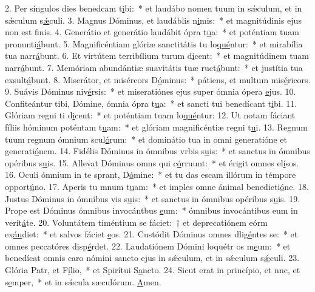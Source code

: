 2. Per síngulos dies benedcam t\uline{i}bi:~* et laudábo nomen tuum in sǽculum, et in sǽculum s\uline{ǽ}culi.
3. Magnus Dóminus, et laudáblis n\uline{i}mis:~* et magnitúdinis ejus non est f\uline{i}nis.
4. Generátio et generátio laudábit ópra t\uline{u}a:~* et poténtiam tuam pronunti\uline{á}bunt.
5. Magnificéntiam glóriæ sanctitátis tu lo\uline{qué}ntur:~* et mirabília tua narr\uline{á}bunt.
6. Et virtútem terribílium turum d\uline{i}cent:~* et magnitúdinem tuam narr\uline{á}bunt.
7. Memóriam abundántiæ suavitátis tuæ ruct\uline{á}bunt:~* et justítia tua exsult\uline{á}bunt.
8. Miserátor, et misércors D\uline{ó}minus:~* pátiens, et multum mis\uline{é}ricors.
9. Suávis Dóminus niv\uline{é}rsis:~* et miseratiónes ejus super ómnia ópera \uline{e}jus.
10. Confiteántur tibi, Dómine, ómnia ópra t\uline{u}a:~* et sancti tui benedícant t\uline{i}bi.
11. Glóriam regni ti d\uline{i}cent:~* et poténtiam tuam lo\uline{qué}ntur:
12. Ut notam fáciant fíliis hóminum poténtam t\uline{u}am:~* et glóriam magnificéntiæ regni t\uline{u}i.
13. Regnum tuum regnum ómnium scul\uline{ó}rum:~* et dominátio tua in omni generatióne et generati\uline{ó}nem.
14. Fidélis Dóminus in ómnibus vrbis s\uline{u}is:~* et sanctus in ómnibus opéribus s\uline{u}is.
15. Allevat Dóminus omns qui c\uline{ó}rruunt:~* et érigit omnes el\uline{í}sos.
16. Oculi ómnium in te sprant, D\uline{ó}mine:~* et tu das escam illórum in témpore opport\uline{ú}no.
17. Aperis tu mnum t\uline{u}am:~* et imples omne ánimal benedicti\uline{ó}ne.
18. Justus Dóminus in ómnibus vis s\uline{u}is:~* et sanctus in ómnibus opéribus s\uline{u}is.
19. Prope est Dóminus ómnibus invocántbus \uline{e}um:~* ómnibus invocántibus eum in verit\uline{á}te.
20. Voluntátem timéntium se fáciet:~† et deprecatiónem eórm ex\uline{áu}diet:~* et salvos fáciet \uline{e}os.
21. Custódit Dóminus omnes dlig\uline{é}ntes se:~* et omnes peccatóres disp\uline{é}rdet.
22. Laudatiónem Dómini loquétr os m\uline{e}um:~* et benedícat omnis caro nómini sancto ejus in sǽculum, et in sǽculum s\uline{ǽ}culi.
23. Glória Patr, et F\uline{í}lio,~* et Spirítui S\uline{a}ncto.
24. Sicut erat in princípio, et nnc, et s\uline{e}mper,~* et in sǽcula sæculórum. \uline{A}men.
